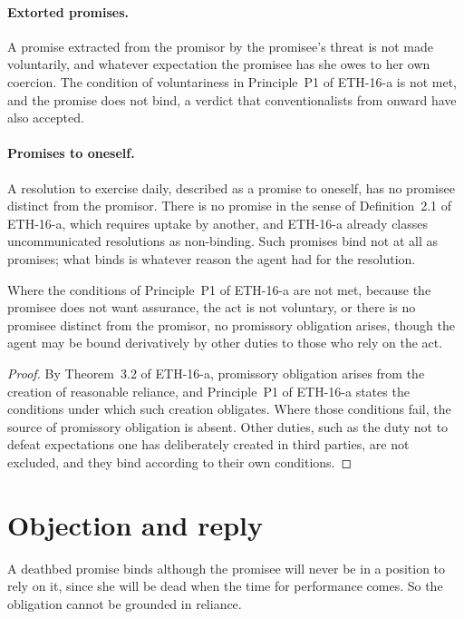 \documentclass{situationist-preprint}
\begin{document}
\paragraph{Extorted promises.} A promise extracted from the promisor by the promisee's threat is not made voluntarily, and whatever expectation the promisee has she owes to her own coercion. The condition of voluntariness in Principle~P1 of ETH-16-a is not met, and the promise does not bind, a verdict that conventionalists from \citet[3.2.5]{Hume1739} onward have also accepted.

\paragraph{Promises to oneself.} A resolution to exercise daily, described as a promise to oneself, has no promisee distinct from the promisor. There is no promise in the sense of Definition~2.1 of ETH-16-a, which requires uptake by another, and ETH-16-a already classes uncommunicated resolutions as non-binding. Such promises bind not at all as promises; what binds is whatever reason the agent had for the resolution.

\begin{proposition}\label{p:noreasonable}
Where the conditions of Principle~P1 of ETH-16-a are not met, because the promisee does not want assurance, the act is not voluntary, or there is no promisee distinct from the promisor, no promissory obligation arises, though the agent may be bound derivatively by other duties to those who rely on the act.
\end{proposition}

\begin{proof}
By Theorem~3.2 of ETH-16-a, promissory obligation arises from the creation of reasonable reliance, and Principle~P1 of ETH-16-a states the conditions under which such creation obligates. Where those conditions fail, the source of promissory obligation is absent. Other duties, such as the duty not to defeat expectations one has deliberately created in third parties, are not excluded, and they bind according to their own conditions.
\end{proof}

\section{Objection and reply}

\begin{objection}
A deathbed promise binds although the promisee will never be in a position to rely on it, since she will be dead when the time for performance comes. So the obligation cannot be grounded in reliance.
\end{objection}
\end{document}
